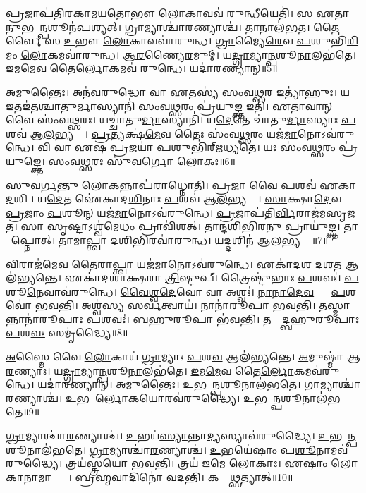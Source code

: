 \ul{𑌪𑍍𑌰}𑌜𑌾𑌪॑𑌤𑌿𑌰𑌕𑌾𑌮𑌯\ul{𑌤𑍋}𑌭𑍗 \ul{𑌲𑍋}𑌕𑌾𑌵𑌵॑ 𑌰𑍁\ul{𑌨𑍍𑌧𑍀}𑌯𑍇𑌤𑌿॑।
𑌸 \ul{𑌏}𑌤𑌾\ul{𑌨𑍁}𑌭𑌯𑌾᳚\ul{𑌨𑍍𑌪}𑌶𑍂𑌨॑𑌪𑌶𑍍𑌯𑌤𑍍।
\ul{𑌗𑍍𑌰𑌾}𑌮𑍍𑌯𑌾𑌶𑍍𑌚𑌾॑\ul{𑌰}𑌣𑍍𑌯𑌾𑌶𑍍𑌚॑।
𑌤𑌾𑌨𑌾𑌲॑𑌭𑌤।
𑌤𑍈𑌰𑍍𑌵𑍈 𑌸 \ul{𑌉}𑌭𑍗 \ul{𑌲𑍋}𑌕𑌾𑌵𑌵𑌾॑𑌰𑍁𑌨𑍍𑌧।
\ul{𑌗𑍍𑌰𑌾}𑌮𑍍𑌯𑍈\ul{𑌰𑍇}𑌵 \ul{𑌪}𑌶𑍁𑌭𑌿॑\ul{𑌰𑌿}𑌮𑌂 \ul{𑌲𑍋}𑌕𑌮𑌵𑌾॑𑌰𑍁𑌨𑍍𑌧।
\ul{𑌆}\ul{𑌰}𑌣𑍍𑌯𑍈\ul{𑌰}𑌮𑍁𑌮𑍍।
𑌯\ul{𑌦𑍍𑌗𑍍𑌰𑌾}𑌮𑍍𑌯𑌾\ul{𑌨𑍍𑌪}𑌶𑍂\ul{𑌨𑌾}𑌲𑌭॑𑌤𑍇।
\ul{𑌇}𑌮\ul{𑌮𑍇}𑌵 𑌤𑍈\ul{𑌰𑍍𑌲𑍋}𑌕𑌮𑌵॑ 𑌰𑍁𑌨𑍍𑌧𑍇।
𑌯𑌦𑌾॑\ul{𑌰}𑌣𑍍𑌯𑌾𑌨𑍍॥5॥

\ul{𑌅}𑌮𑍁𑌨𑍍𑌤𑍈𑌃।
𑌅𑌨॑𑌵𑌰𑍁\ul{𑌦𑍍𑌧𑍋} 𑌵𑌾 \ul{𑌏}𑌤𑌸𑍍𑌯॑ 𑌸𑌂𑌵\ul{𑌥𑍍𑌸}𑌰 𑌇𑌤𑍍𑌯𑌾॑𑌹𑍁𑌃।
𑌯 \ul{𑌇}𑌤𑌇॑𑌤𑌶𑍍𑌚𑌾𑌤𑍁\ul{𑌰𑍍𑌮𑌾}𑌸𑍍𑌯𑌾𑌨𑌿॑ 𑌸𑌂𑌵\ul{𑌥𑍍𑌸}𑌰𑌂 𑌪𑍍𑌰॑\ul{𑌯𑍁}𑌙𑍍𑌕𑍍𑌤 𑌇𑌤𑌿॑।
\ul{𑌏}𑌤𑌾\ul{𑌵𑌾}\ul{𑌨𑍍} 𑌵𑍈 𑌸𑌂॑𑌵\ul{𑌥𑍍𑌸}𑌰𑌃।
𑌯𑌚𑍍𑌚𑌾॑𑌤𑍁\ul{𑌰𑍍𑌮𑌾}𑌸𑍍𑌯𑌾𑌨𑌿॑।
𑌯\ul{𑌦𑍇}𑌤𑍇 𑌚𑌾॑𑌤𑍁\ul{𑌰𑍍𑌮𑌾}𑌸𑍍𑌯𑌾𑌃 \ul{𑌪}𑌶𑌵॑ 𑌆\ul{𑌲}𑌭𑍍𑌯𑌨𑍍𑌤𑍇᳚।
\ul{𑌪𑍍𑌰}𑌤𑍍𑌯𑌕𑍍𑌷॑\ul{𑌮𑍇}𑌵 𑌤𑍈𑌃 𑌸𑌂॑𑌵\ul{𑌥𑍍𑌸}𑌰𑌂 𑌯𑌜॑\ul{𑌮𑌾}𑌨𑍋\-𑌽𑌵॑𑌰𑍁𑌨𑍍𑌧𑍇।
𑌵𑌿 𑌵𑌾 \ul{𑌏}𑌷 \ul{𑌪𑍍𑌰}𑌜𑌯𑌾॑ \ul{𑌪}𑌶𑍁𑌭𑌿॑𑌰𑍍‌\mbox{}𑌋𑌧𑍍𑌯𑌤𑍇।
𑌯𑌃 𑌸𑌂॑𑌵\ul{𑌥𑍍𑌸}𑌰𑌂 𑌪𑍍𑌰॑\ul{𑌯𑍁}𑌙𑍍𑌕𑍍𑌤𑍇।
\ul{𑌸𑌂}\ul{𑌵}\ul{𑌥𑍍𑌸}𑌰𑌃 𑌸𑍁॑\ul{𑌵}𑌰𑍍𑌗𑍋 \ul{𑌲𑍋}𑌕𑌃॥6॥

\ul{𑌸𑍁}\ul{𑌵}𑌰𑍍𑌗𑌨𑍍𑌤𑍁 \ul{𑌲𑍋}𑌕𑌨𑍍𑌨𑌾𑌪॑𑌰𑌾𑌧𑍍𑌨𑍋𑌤𑌿।
\ul{𑌪𑍍𑌰}𑌜𑌾 𑌵𑍈 \ul{𑌪}𑌶𑌵॑ 𑌏𑌕𑌾\ul{𑌦}𑌶𑌿𑌨𑍀᳚।
𑌯\ul{𑌦𑍇}𑌤 𑌐॑𑌕𑌾𑌦\ul{𑌶𑌿}𑌨𑌾𑌃 \ul{𑌪}𑌶𑌵॑ 𑌆\ul{𑌲}𑌭𑍍𑌯𑌨𑍍𑌤𑍇᳚।
\ul{𑌸𑌾}𑌕𑍍𑌷𑌾\ul{𑌦𑍇}𑌵 \ul{𑌪𑍍𑌰}𑌜𑌾𑌂 \ul{𑌪}𑌶𑍂𑌨𑍍 𑌯𑌜॑\ul{𑌮𑌾}𑌨𑍋\-𑌽𑌵॑𑌰𑍁𑌨𑍍𑌧𑍇।
\ul{𑌪𑍍𑌰}𑌜𑌾𑌪॑𑌤𑌿\ul{𑌰𑍍𑌵𑌿}𑌰𑌾𑌜॑𑌮𑌸𑍃𑌜𑌤।
𑌸𑌾 \ul{𑌸𑍃}𑌷𑍍𑌟𑌾\-𑌽𑌶𑍍𑌵॑\ul{𑌮𑍇}𑌧𑌂 𑌪𑍍𑌰𑌾𑌵𑌿॑𑌶𑌤𑍍।
𑌤𑌾\ul{𑌨𑍍𑌦}𑌶𑌿\ul{𑌭𑌿}𑌰\ul{𑌨𑍁} 𑌪𑍍𑌰𑌾𑌯𑍁॑𑌙𑍍𑌕𑍍𑌤।
𑌤𑌾𑌮𑌾᳚𑌪𑍍𑌨𑍋𑌤𑍍।
𑌤𑌾\ul{𑌮𑌾}𑌪𑍍𑌤𑍍𑌵𑌾 \ul{𑌦}𑌶𑌿\ul{𑌭𑌿}𑌰𑌵𑌾॑𑌰𑍁𑌨𑍍𑌧।
𑌯\ul{𑌦𑍍𑌦}𑌶𑌿𑌨॑ 𑌆\ul{𑌲}𑌭𑍍𑌯𑌨𑍍𑌤𑍇᳚॥7॥

\ul{𑌵𑌿}𑌰𑌾𑌜॑\ul{𑌮𑍇}𑌵 𑌤𑍈\ul{𑌰𑌾}𑌪𑍍𑌤𑍍𑌵𑌾 𑌯𑌜॑\ul{𑌮𑌾}𑌨𑍋\-𑌽𑌵॑𑌰𑍁𑌨𑍍𑌧𑍇।
𑌏𑌕𑌾॑𑌦𑌶 \ul{𑌦}𑌶\ul{𑌤} 𑌆𑌲॑𑌭𑍍𑌯𑌨𑍍𑌤𑍇।
𑌏𑌕𑌾॑𑌦𑌶𑌾𑌕𑍍𑌷𑌰𑌾 \ul{𑌤𑍍𑌰𑌿}𑌷𑍍𑌟𑍁𑌪𑍍।
𑌤𑍍𑌰𑍈𑌷𑍍𑌟𑍁॑𑌭𑌾𑌃 \ul{𑌪}𑌶𑌵𑌃॑।
\ul{𑌪}𑌶𑍂\ul{𑌨𑍇}𑌵𑌾𑌵॑𑌰𑍁𑌨𑍍𑌧𑍇।
\ul{𑌵𑍈}\ul{𑌶𑍍𑌵}\ul{𑌦𑍇}𑌵𑍋 𑌵𑌾 𑌅𑌶𑍍𑌵𑌃॑।
\ul{𑌨𑌾}\ul{𑌨𑌾}\ul{𑌦𑍇}\ul{𑌵}𑌤𑍍𑌯𑌾𑌃᳚ \ul{𑌪}𑌶𑌵𑍋॑ 𑌭𑌵𑌨𑍍𑌤𑌿।
𑌅𑌶𑍍𑌵॑𑌸𑍍𑌯 𑌸\ul{𑌰𑍍𑌵}𑌤𑍍𑌵𑌾𑌯॑।
𑌨𑌾𑌨𑌾॑𑌰𑍂𑌪𑌾 𑌭𑌵𑌨𑍍𑌤𑌿।
𑌤\ul{𑌸𑍍𑌮𑌾}𑌨𑍍𑌨𑌾𑌨𑌾॑𑌰𑍂𑌪𑌾𑌃 \ul{𑌪}𑌶𑌵𑌃॑।
\ul{𑌬}\ul{𑌹𑍁}\ul{𑌰𑍂}𑌪𑌾 𑌭॑𑌵𑌨𑍍𑌤𑌿।
𑌤𑌸𑍍𑌮𑌾᳚𑌦𑍍𑌬𑌹𑍁\ul{𑌰𑍂}𑌪𑌾𑌃 \ul{𑌪}𑌶\ul{𑌵𑌃} 𑌸𑌮𑍃॑𑌦𑍍𑌧𑍍𑌯𑍈॥8॥\anuvakamend[\ul{𑌆}\ul{𑌰}𑌣𑍍𑌯𑌾𑌁\ul{𑌲𑍍𑌲𑍋}𑌕𑍋 \ul{𑌦}𑌶𑌿𑌨॑ 𑌆\ul{𑌲}𑌭𑍍𑌯\ul{𑌨𑍍𑌤𑍇} 𑌨𑌾𑌨𑌾॑𑌰𑍂𑌪𑌾𑌃 \ul{𑌪}𑌶\ul{𑌵𑍋} 𑌦𑍍𑌵𑍇 𑌚॑]

\ul{𑌅}𑌸𑍍𑌮𑍈 𑌵𑍈 \ul{𑌲𑍋}𑌕𑌾𑌯॑ \ul{𑌗𑍍𑌰𑌾}𑌮𑍍𑌯𑌾𑌃 \ul{𑌪}𑌶\ul{𑌵} 𑌆𑌲॑𑌭𑍍𑌯𑌨𑍍𑌤𑍇।
\ul{𑌅}𑌮𑍁𑌷𑍍𑌮𑌾॑ 𑌆\ul{𑌰}𑌣𑍍𑌯𑌾𑌃।
𑌯\ul{𑌦𑍍𑌗𑍍𑌰𑌾}𑌮𑍍𑌯𑌾\ul{𑌨𑍍𑌪}𑌶𑍂\ul{𑌨𑌾}𑌲𑌭॑𑌤𑍇।
\ul{𑌇}𑌮\ul{𑌮𑍇}𑌵 𑌤𑍈\ul{𑌰𑍍𑌲𑍋}𑌕𑌮𑌵॑𑌰𑍁𑌨𑍍𑌧𑍇।
𑌯𑌦𑌾॑\ul{𑌰}𑌣𑍍𑌯𑌾𑌨𑍍।
\ul{𑌅}𑌮𑍁𑌨𑍍𑌤𑍈𑌃।
\ul{𑌉}𑌭𑌯𑌾᳚\ul{𑌨𑍍𑌪}𑌶𑍂𑌨𑌾𑌲॑𑌭𑌤𑍇।
\ul{𑌗𑌾}𑌮𑍍𑌯𑌾𑌶𑍍𑌚𑌾॑\ul{𑌰}𑌣𑍍𑌯𑌾𑌶𑍍𑌚॑।
\ul{𑌉}𑌭𑌯𑍋᳚\ul{𑌰𑍍𑌲𑍋}𑌕\ul{𑌯𑍋}𑌰𑌵॑𑌰𑍁𑌦𑍍𑌧𑍍𑌯𑍈।
\ul{𑌉}𑌭𑌯𑌾᳚\ul{𑌨𑍍𑌪}𑌶𑍂𑌨𑌾\-𑌲॑𑌭𑌤𑍇॥9॥

\ul{𑌗𑍍𑌰𑌾}𑌮𑍍𑌯𑌾𑌶𑍍𑌚𑌾॑\ul{𑌰}𑌣𑍍𑌯𑌾𑌶𑍍𑌚॑।
\ul{𑌉}𑌭𑌯॑\ul{𑌸𑍍𑌯𑌾}𑌨𑍍𑌨𑌾\ul{𑌦𑍍𑌯}𑌸𑍍𑌯𑌾𑌵॑𑌰𑍁𑌦𑍍𑌧𑍍𑌯𑍈।
\ul{𑌉}𑌭𑌯𑌾᳚\ul{𑌨𑍍𑌪}𑌶𑍂𑌨𑌾𑌲॑𑌭𑌤𑍇।
\ul{𑌗𑍍𑌰𑌾}𑌮𑍍𑌯𑌾𑌶𑍍𑌚𑌾॑\ul{𑌰}𑌣𑍍𑌯𑌾𑌶𑍍𑌚॑।
\ul{𑌉}𑌭𑌯𑍇॑𑌷𑌾𑌂 𑌪\ul{𑌶𑍂}𑌨𑌾𑌮𑌵॑𑌰𑍁𑌦𑍍𑌧𑍍𑌯𑍈।
𑌤𑍍𑌰𑌯॑𑌸𑍍𑌤𑍍𑌰𑌯𑍋 𑌭𑌵𑌨𑍍𑌤𑌿।
𑌤𑍍𑌰𑌯॑ \ul{𑌇}𑌮𑍇 \ul{𑌲𑍋}𑌕𑌾𑌃।
\ul{𑌏}𑌷𑌾𑌂 \ul{𑌲𑍋}𑌕𑌾\ul{𑌨𑌾}𑌮𑌾𑌪𑍍𑌤𑍍𑌯𑍈᳚।
\ul{𑌬𑍍𑌰}\ul{𑌹𑍍𑌮}\ul{𑌵𑌾}𑌦𑌿𑌨𑍋॑ 𑌵𑌦𑌨𑍍𑌤𑌿।
𑌕𑌸𑍍𑌮𑌾᳚\ul{𑌥𑍍𑌸}𑌤𑍍𑌯𑌾𑌤𑍍॥10॥

